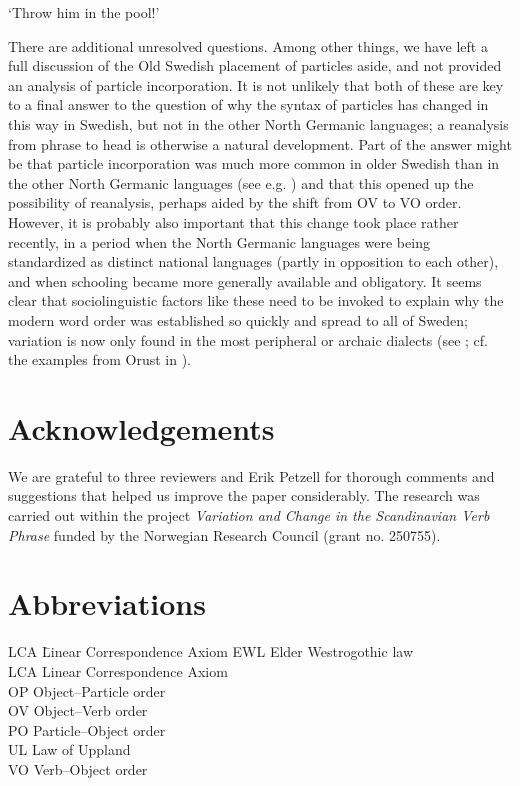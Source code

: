 \documentclass[output=paper]{langscibook}
\begin{document}
\glt `Throw him in the pool!'
\z
\z


There are additional unresolved questions. Among other things, we have left a full discussion of the Old Swedish placement of particles aside, and not provided an analysis of particle incorporation. It is not unlikely that both of these are key to a final answer to the question of why the syntax of particles has changed in this way in Swedish, but not in the other North Germanic languages; a reanalysis from phrase to head is otherwise a natural development. Part of the answer might be that particle incorporation was much more common in older Swedish than in the other North Germanic languages (see e.g. \citealt{Ljunggren1932}) and that this opened up the possibility of reanalysis, perhaps aided by the shift from OV to VO order. However, it is probably also important that this change took place rather recently, in a period when the North Germanic languages were being standardized as distinct national languages (partly in opposition to each other), and when schooling became more generally available and obligatory. It seems clear that sociolinguistic factors like these need to be invoked to explain why the modern word order was established so quickly and spread to all of Sweden; variation is now only found in the most peripheral or archaic dialects (see \citealt{Lundquist2014Active}; cf. the examples from Orust in ).


\section*{Acknowledgements}

We are grateful to three reviewers and Erik Petzell for thorough comments and suggestions that helped us improve the paper considerably. The research was carried out within the project \textit{Variation and Change in the Scandinavian Verb Phrase} funded by the Norwegian Research Council (grant no. 250755).


\section*{Abbreviations}
\begin{multicols}{2}
\begin{tabbing}
LCA \hspace{1ex}\=  Linear Correspondence Axiom\kill
EWL \>  Elder Westrogothic law\\
LCA \>  Linear Correspondence Axiom\\
OP  \> Object--Particle order\\
OV  \> Object–Verb order\\
PO  \> Particle–Object order\\
UL  \> Law of Uppland\\
VO  \> Verb–Object order\\
\end{tabbing}
\end{multicols}
\end{document}
